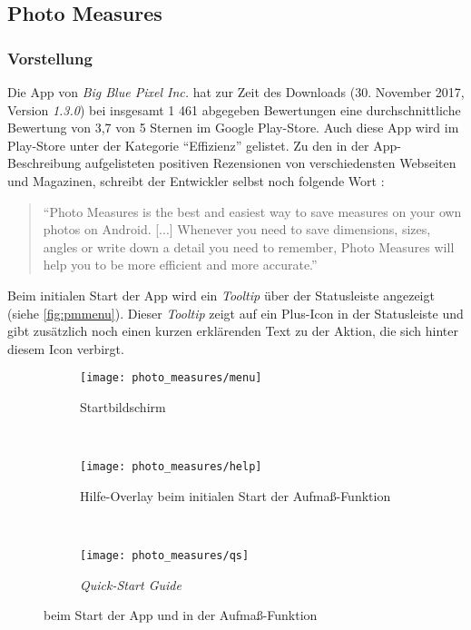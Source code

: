 \subsection{Photo Measures}

\subsubsection{Vorstellung}
Die App \pm{} von \emph{Big Blue Pixel Inc.} hat zur Zeit des Downloads (30. November 2017, Version \emph{1.3.0}) bei insgesamt 1 461 abgegeben Bewertungen eine durchschnittliche Bewertung von 3,7 von 5 Sternen im Google Play-Store.
Auch diese App wird im Play-Store unter der Kategorie ``Effizienz'' gelistet.
Zu den in der App-Beschreibung aufgelisteten positiven Rezensionen von verschiedensten Webseiten und Magazinen, schreibt der Entwickler selbst noch folgende Wort \citep{PixelPM}:

\begin{quote}
  ``Photo Measures is the best and easiest way to save measures on your own photos on Android.
  [...] Whenever you need to save dimensions, sizes, angles or write down a detail you need to remember, Photo Measures will help you to be more efficient and more accurate.''
\end{quote}

\noindent
Beim initialen Start der App wird ein \emph{Tooltip} über der Statusleiste angezeigt (siehe \autoref{fig:pmmenu}).
Dieser \emph{Tooltip} zeigt auf ein Plus-Icon in der Statusleiste und gibt zusätzlich noch einen kurzen erklärenden Text zu der Aktion, die sich hinter diesem Icon verbirgt.

\begin{figure}[h]
  \begin{subfigure}[t]{0.3\textwidth}
    \centering
    \texttt{[image: photo\_measures/menu]}
    \caption{Startbildschirm}
    \label{fig:pmmenu}	
  \end{subfigure}
  ~
  \begin{subfigure}[t]{0.3\textwidth}
    \centering
    \texttt{[image: photo\_measures/help]}
    \caption{Hilfe-Overlay beim initialen Start der Aufmaß-Funktion} 
    \label{fig:pmhelp}	
  \end{subfigure}
  ~
  \begin{subfigure}[t]{0.3\textwidth}
    \centering
    \texttt{[image: photo\_measures/qs]}
    \caption{\emph{Quick-Start Guide}}
    \label{fig:pmqs}
  \end{subfigure}
  \centering
  \caption{\pm{} beim Start der App und in der Aufmaß-Funktion}
\end{figure}

